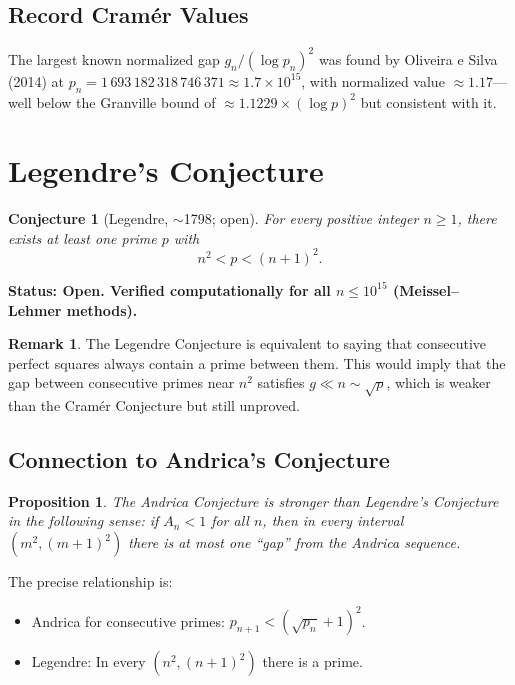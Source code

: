 \documentclass[12pt,a4paper]{amsart}
\newtheorem{proposition}[theorem]{Proposition}
\newtheorem{conjecture}[theorem]{Conjecture}
\theoremstyle{definition}
\newtheorem{remark}[theorem]{Remark}
\begin{document}
\subsection{Record Cram\'{e}r Values}

The largest known normalized gap $g_n/(\log p_n)^2$ was found by Oliveira e
Silva (2014) at $p_n = 1\,693\,182\,318\,746\,371 \approx 1.7 \times 10^{15}$,
with normalized value $\approx 1.17$---well below the Granville bound of
$\approx 1.1229 \times (\log p)^2$ but consistent with it.

\section{Legendre's Conjecture}

\begin{conjecture}[Legendre, $\sim$1798; open]
\label{conj:legendre}
For every positive integer $n \geq 1$, there exists at least one prime $p$ with
\[
  n^2 < p < (n+1)^2.
\]
\end{conjecture}

\textbf{Status: Open. Verified computationally for all $n \leq 10^{15}$
(Meissel--Lehmer methods).}

\begin{remark}
The Legendre Conjecture is equivalent to saying that consecutive perfect squares
always contain a prime between them. This would imply that the gap between
consecutive primes near $n^2$ satisfies $g \ll n \sim \sqrt{p}$, which is
weaker than the Cram\'{e}r Conjecture but still unproved.
\end{remark}

\subsection{Connection to Andrica's Conjecture}

\begin{proposition}
The Andrica Conjecture is stronger than Legendre's Conjecture in the following
sense: if $A_n < 1$ for all $n$, then in every interval $(m^2, (m+1)^2)$ there
is at most one ``gap'' from the Andrica sequence.
\end{proposition}

The precise relationship is:

\begin{itemize}
  \item Andrica for consecutive primes: $p_{n+1} < (\sqrt{p_n}+1)^2$.
  \item Legendre: In every $(n^2, (n+1)^2)$ there is a prime.
\end{itemize}
\end{document}

